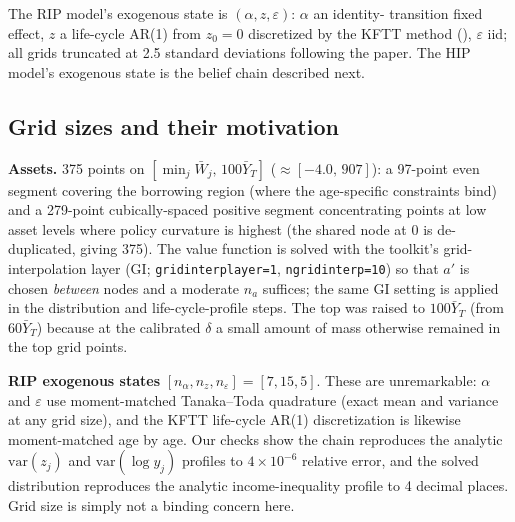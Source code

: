\documentclass[11pt,fleqn]{article}
\begin{document}
The RIP model's exogenous state is $(\alpha, z, \varepsilon)$: $\alpha$ an identity-%
transition fixed effect, $z$ a life-cycle AR(1) from $z_0=0$ discretized by the KFTT
method (\cite{Kirkby2025}), $\varepsilon$ iid; all grids truncated at 2.5 standard
deviations following the paper. The HIP model's exogenous state is the belief chain
described next.

\subsection{Grid sizes and their motivation}
\label{sec:grids}

\textbf{Assets.} 375 points on $[\min_j \bar{W}_j,\, 100\bar{Y}_T]$
($\approx[-4.0,\,907]$): a 97-point even segment covering the borrowing region
(where the age-specific constraints bind) and a 279-point cubically-spaced positive
segment concentrating points at low asset levels where policy curvature is highest
(the shared node at $0$ is de-duplicated, giving 375). The value function is solved with
the toolkit's grid-interpolation layer (GI; \texttt{gridinterplayer=1},
\texttt{ngridinterp=10}) so that $a'$ is chosen \emph{between} nodes and a moderate $n_a$
suffices; the same GI setting is applied in the distribution and life-cycle-profile
steps. The top was raised to $100\bar{Y}_T$ (from $60\bar{Y}_T$) because at the
calibrated $\delta$ a small amount of mass otherwise remained in the top grid points.

\textbf{RIP exogenous states} $[n_\alpha,n_z,n_\varepsilon]=[7,15,5]$. These are
unremarkable: $\alpha$ and $\varepsilon$ use moment-matched Tanaka--Toda quadrature
(exact mean and variance at any grid size), and the KFTT life-cycle AR(1)
discretization is likewise moment-matched age by age. Our checks show the chain
reproduces the analytic $\mathrm{var}(z_j)$ and $\mathrm{var}(\log y_j)$ profiles to
$4\times10^{-6}$ relative error, and the solved distribution reproduces the analytic
income-inequality profile to 4 decimal places. Grid size is simply not a binding
concern here.
\end{document}
